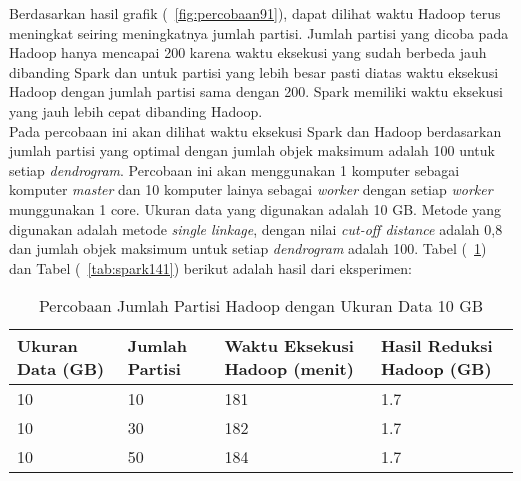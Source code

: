 Berdasarkan hasil grafik (~\ref{fig:percobaan91}), dapat dilihat waktu Hadoop terus meningkat seiring meningkatnya jumlah partisi. Jumlah partisi yang dicoba pada Hadoop hanya mencapai 200 karena waktu eksekusi yang sudah berbeda jauh dibanding Spark dan untuk partisi yang lebih besar pasti diatas waktu eksekusi Hadoop dengan jumlah partisi sama dengan 200. Spark memiliki waktu eksekusi yang jauh lebih cepat dibanding Hadoop.  \\



Pada percobaan ini akan dilihat waktu eksekusi Spark dan Hadoop berdasarkan jumlah partisi yang optimal dengan jumlah objek maksimum adalah 100 untuk setiap \textit{dendrogram}. Percobaan ini akan menggunakan 1 komputer sebagai komputer \textit{master} dan 10 komputer lainya sebagai \textit{worker} dengan setiap \textit{worker} munggunakan 1 core. Ukuran data yang digunakan adalah 10 GB. Metode yang digunakan adalah metode \textit{single linkage}, dengan nilai \textit{cut-off distance} adalah 0,8 dan jumlah objek maksimum untuk setiap \textit{dendrogram} adalah 100. Tabel (~\ref{tab:spark131}) dan Tabel (~\ref{tab:spark141}) berikut adalah hasil dari eksperimen:





\begin{table}[H] 
	\centering 
	\caption{Percobaan Jumlah Partisi Hadoop dengan Ukuran Data 10 GB}
	\label{tab:spark131}
	\begin{tabular}{|p{3cm}|p{3cm}|p{4cm}|p{4cm}|}
\hline
Ukuran Data (GB) & Jumlah Partisi &  Waktu Eksekusi Hadoop (menit) & Hasil Reduksi Hadoop (GB)\\
\hline
10 & 10 & 181  & 1.7  \\
\hline
10 & 30 & 182  & 1.7  \\
\hline
10 & 50 & 184  & 1.7   \\
\hline


\hline

	\end{tabular} 
\end{table}




